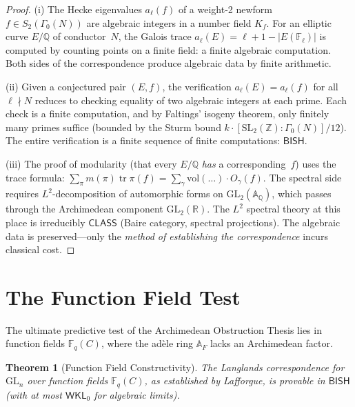 \documentclass[11pt,a4paper]{article}
\theoremstyle{plain}
\newtheorem{theorem}{Theorem}[section]
\theoremstyle{definition}
\newcommand{\BISH}{\textsf{BISH}}
\newcommand{\WKL}{\textsf{WKL}_0}
\newcommand{\CLASS}{\textsf{CLASS}}
\newcommand{\Z}{\mathbb{Z}}
\newcommand{\Q}{\mathbb{Q}}
\newcommand{\R}{\mathbb{R}}
\newcommand{\F}{\mathbb{F}}
\newcommand{\A}{\mathbb{A}}
\newcommand{\GL}{\mathrm{GL}}
\newcommand{\SL}{\mathrm{SL}}
\DeclareMathOperator{\tr}{tr}
\begin{document}
\begin{proof}
(i) The Hecke eigenvalues $a_\ell(f)$ of a weight-2 newform $f \in S_2(\Gamma_0(N))$ are algebraic integers in a number field $K_f$. For an elliptic curve $E/\Q$ of conductor~$N$, the Galois trace $a_\ell(E) = \ell + 1 - |E(\F_\ell)|$ is computed by counting points on a finite field: a finite algebraic computation. Both sides of the correspondence produce algebraic data by finite arithmetic.

(ii) Given a conjectured pair $(E, f)$, the verification $a_\ell(E) = a_\ell(f)$ for all $\ell \nmid N$ reduces to checking equality of two algebraic integers at each prime. Each check is a finite computation, and by Faltings' isogeny theorem, only finitely many primes suffice (bounded by the Sturm bound $k \cdot [\SL_2(\Z) : \Gamma_0(N)] / 12$). The entire verification is a finite sequence of finite computations: $\BISH$.

(iii) The proof of modularity (that every $E/\Q$ \emph{has} a corresponding~$f$) uses the trace formula: $\sum_\pi m(\pi) \tr \pi(f) = \sum_\gamma \mathrm{vol}(\dots) \cdot O_\gamma(f)$. The spectral side requires $L^2$-decomposition of automorphic forms on $\GL_2(\A_\Q)$, which passes through the Archimedean component $\GL_2(\R)$. The $L^2$ spectral theory at this place is irreducibly $\CLASS$ (Baire category, spectral projections). The algebraic data is preserved---only the \emph{method of establishing the correspondence} incurs classical cost.
\end{proof}


\section{The Function Field Test}\label{sec:function-fields}

The ultimate predictive test of the Archimedean Obstruction Thesis lies in function fields $\F_q(C)$, where the ad\`ele ring $\A_F$ lacks an Archimedean factor. 

\begin{theorem}[Function Field Constructivity]\label{thm:ff}
The Langlands correspondence for $\GL_n$ over function fields $\F_q(C)$, as established by Lafforgue, is provable in $\BISH$ (with at most $\WKL$ for algebraic limits).
\end{theorem}
\end{document}
